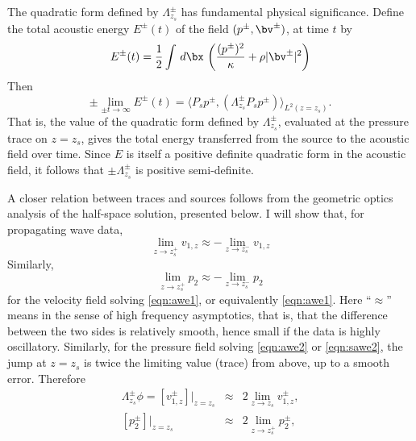 The quadratic form defined by $\Lambda^{\pm}_{z_s}$ has fundamental
physical significance. Define the total acoustic energy $E^{\pm}(t)$ of the
field $(p^{\pm},\bv^{\pm})$, at time $t$ by
\begin{equation}
  \label{eqn:defae0}
  E^{\pm}(t) = \frac{1}{2} \int \,d\bx \, \left(\frac{(p^{\pm})^2}{\kappa} + \rho |\bv^{\pm}|^2\right)
\end{equation}
Then
\begin{equation}
  \label{eqn:elim}
  \pm \lim_{\pm t \rightarrow \infty} E^{\pm}(t) =  \langle P_sp^{\pm},
  (\Lambda^{\pm}_{z_s} P_sp^{\pm}) \rangle_{L^2(z=z_s)}.
\end{equation}
That is, the value of the quadratic form defined by
$\Lambda^{\pm}_{z_s}$, evaluated at the pressure trace on $z=z_s$,
gives the total energy transferred from the source to the
acoustic field over time. Since $E$ is itself a positive definite
quadratic form in the acoustic field, it follows that $\pm
\Lambda^{\pm}_{z_s}$ is positive semi-definite.

A closer relation between traces and sources follows from the
geometric optics analysis of the half-space solution, presented
below. I will show that, for propagating wave data,
\begin{equation}
  \label{eqn:odd1}
  \lim_{z\rightarrow z_s^+} v_{1,z} \approx - \lim_{z\rightarrow z_s^-}
  v_{1,z}
\end{equation}
Similarly,
\begin{equation}
  \label{eqn:odd2}
  \lim_{z\rightarrow z_s^+} p_{2} \approx - \lim_{z\rightarrow z_s^-}
  p_{2}
\end{equation}
for the velocity field solving \ref{eqn:awe1}, or equivalently
\ref{eqn:awe1}. Here ``$\approx$'' means in the sense of high
frequency asymptotics, that is, that the difference between the two
sides is relatively smooth, hence small if the data is highly
oscillatory. Similarly, for the pressure field solving \ref{eqn:awe2}
or \ref{eqn:sawe2}, the jump at $z=z_s$ is twice the limiting value
(trace) from above, up to a smooth error. Therefore
\begin{eqnarray}
  \Lambda^{\pm}_{z_s}\phi = [v^{\pm}_{1,z}]|_{z=z_s} &\approx& 2
                              \lim_{z\rightarrow z_s}v^{\pm}_{1,z},\\  \label{eqn:tracejump1}
  [p^{\pm}_2]|_{z=z_s} &\approx& 2 \lim_{z\rightarrow z_s^+}p^{\pm}_{2},\\  \label{eqn:tracejump2}
\end{eqnarray}

